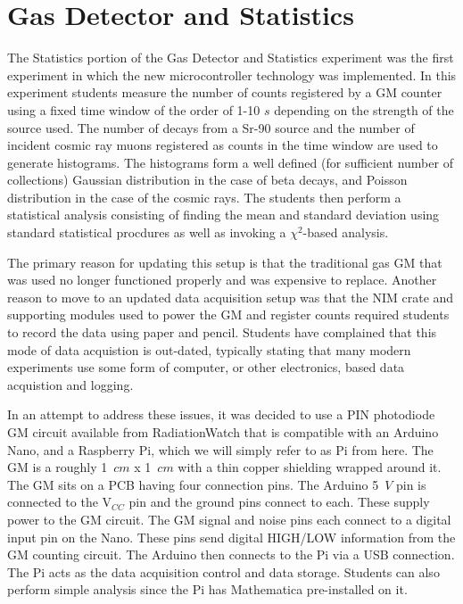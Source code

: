 \section{Gas Detector and Statistics}
The Statistics portion of the Gas Detector and Statistics experiment was the first experiment in which the new microcontroller technology was implemented.
In this experiment students measure the number of counts registered by a GM counter using a fixed time window of the order of 1-10 $s$ depending on the strength of the source used.
The number of decays from a Sr-90 source and the number of incident cosmic ray muons registered as counts in the time window are used to generate histograms.
The histograms form a well defined (for sufficient number of collections) Gaussian distribution in the case of beta decays, and Poisson distribution in the case of the cosmic rays.
The students then perform a statistical analysis consisting of finding the mean and standard deviation using standard statistical procdures as well as invoking a $\chi^2$-based analysis.

The primary reason for updating this setup is that the traditional gas GM that was used no longer functioned properly and was expensive to replace.
Another reason to move to an updated data acquisition setup was that the NIM crate and supporting modules used to power the GM and register counts required students to record the data using paper and pencil.
Students have complained that this mode of data acquistion is out-dated, typically stating that many modern experiments use some form of computer, or other electronics, based data acquistion and logging.


In an attempt to address these issues, it was decided to use a PIN photodiode GM circuit available from RadiationWatch that is compatible with an Arduino Nano, and a Raspberry Pi, which we will simply refer to as Pi from here.
The GM is a roughly 1~$cm$ x 1~$cm$ with a thin copper shielding wrapped around it.
The GM sits on a PCB having four connection pins.
The Arduino 5~$V$ pin is connected to the V$_{CC}$ pin and the ground pins connect to each.
These supply power to the GM circuit.
The GM signal and noise pins each connect to a digital input pin on the Nano.
These pins send digital HIGH/LOW information from the GM counting circuit.
The Arduino then connects to the Pi via a USB connection.
The Pi acts as the data acquisition control and data storage.
Students can also perform simple analysis since the Pi has Mathematica pre-installed on it.

